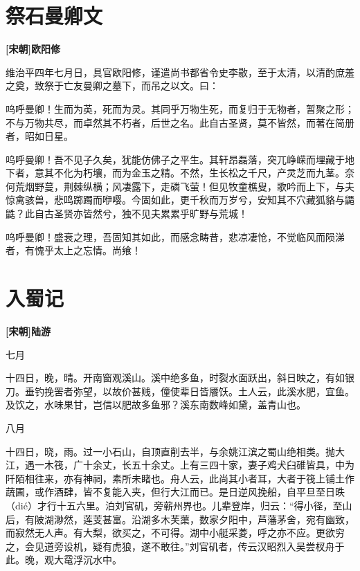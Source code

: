\documentclass[UTF8,titlepage,oneside]{ctexbook}
\begin{document}
\chapter*{祭石曼卿文}
\begin{center}
	\textbf{[宋朝]欧阳修}
\end{center}

维治平四年七月日，具官欧阳修，谨遣尚书都省令史李敭，至于太清，以清酌庶羞之奠，致祭于亡友曼卿之墓下，而吊之以文。曰：


呜呼曼卿！生而为英，死而为灵。其同乎万物生死，而复归于无物者，暂聚之形；不与万物共尽，而卓然其不朽者，后世之名。此自古圣贤，莫不皆然，而著在简册者，昭如日星。


呜呼曼卿！吾不见子久矣，犹能仿佛子之平生。其轩昂磊落，突兀峥嵘而埋藏于地下者，意其不化为朽壤，而为金玉之精。不然，生长松之千尺，产灵芝而九茎。奈何荒烟野蔓，荆棘纵横；风凄露下，走磷飞萤！但见牧童樵叟，歌吟而上下，与夫惊禽骇兽，悲鸣踯躅而咿嘤。今固如此，更千秋而万岁兮，安知其不穴藏狐貉与鼯鼪？此自古圣贤亦皆然兮，独不见夫累累乎旷野与荒城！


呜呼曼卿！盛衰之理，吾固知其如此，而感念畴昔，悲凉凄怆，不觉临风而陨涕者，有愧乎太上之忘情。尚飨！



\chapter*{入蜀记}
\begin{center}
	\textbf{[宋朝]陆游}
\end{center}

七月


十四日，晚，晴。开南窗观溪山。溪中绝多鱼，时裂水面跃出，斜日映之，有如银刀。垂钓挽罟者弥望，以故价甚贱，僮使辈日皆餍饫。土人云，此溪水肥，宜鱼。及饮之，水味果甘，岂信以肥故多鱼邪？溪东南数峰如黛，盖青山也。


八月


十四日，晓，雨。过一小石山，自顶直削去半，与余姚江滨之蜀山绝相类。抛大江，遇一木筏，广十余丈，长五十余丈。上有三四十家，妻子鸡犬臼碓皆具，中为阡陌相往来，亦有神祠，素所未睹也。舟人云，此尚其小者耳，大者于筏上铺土作蔬圃，或作酒肆，皆不复能入夹，但行大江而已。是日逆风挽船，自平旦至日昳（dié）才行十五六里。泊刘官矶，旁蕲州界也。儿辈登岸，归云：“得小径，至山后，有陂湖渺然，莲芰甚富。沿湖多木芙蕖，数家夕阳中，芦藩茅舍，宛有幽致，而寂然无人声。有大梨，欲买之，不可得。湖中小艇采菱，呼之亦不应。更欲穷之，会见道旁设机，疑有虎狼，遂不敢往。”刘官矶者，传云汉昭烈入吴尝杈舟于此。晚，观大鼋浮沉水中。
\end{document}
